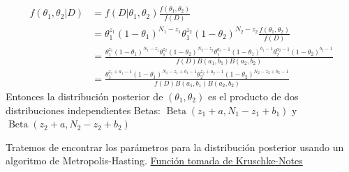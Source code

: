 \documentclass[
  12pt,
]{book}
\theoremstyle{definition}
\theoremstyle{definition}
\theoremstyle{definition}
\theoremstyle{definition}
\theoremstyle{remark}
\begin{document}
\begin{align*}
f\left(\theta_{1}, \theta_{2} | D\right) 
&=f\left(D | \theta_{1}, \theta_{2}\right) \frac{f\left(\theta_{1}, \theta_{2}\right)}{f(D)} \\
&=\theta_{1}^{z_{1}}\left(1-\theta_{1}\right)^{N_{1}-z_{1}} \theta_{1}^{z_{2}}\left(1-\theta_{2}\right)^{N_{2}-z_{2}} \frac{f\left(\theta_{1}, \theta_{2}\right)}{f(D)}  \\
&=\frac{\theta_{1}^{z_{1}}\left(1-\theta_{1}\right)^{N_{1}-z_{1}} \theta_{1}^{z_{2}}\left(1-\theta_{2}\right)^{N_{2}-z_{2}} \theta_{1}^{a_{1}-1}\left(1-\theta_{1}\right)^{b_{1}-1} \theta_{2}^{a_{2}-1}\left(1-\theta_{2}\right)^{b_{2}-1}}{f(D) B\left(a_{1}, b_{1}\right) B\left(a_{2}, b_{2}\right)} \\
&=\frac{\theta_{1}^{z_{1}+a_{1}-1}\left(1-\theta_{1}\right)^{N_{1}-z_{1}+b_{1}-1} \theta_{2}^{z_{2}+a_{2}-1}\left(1-\theta_{2}\right)^{N_{2}-z_{2}+b_{2}-1}}{f(D) B\left(a_{1}, b_{1}\right) B\left(a_{2}, b_{2}\right)}
\end{align*}
Entonces la distribución posterior de \(\left(\theta_{1}, \theta_{2}\right)\) es el producto de dos distribuciones independientes Betas:
\(\operatorname{Beta}\left(z_{1}+a, N_{1}-z_{1}+b_{1}\right)\) y \(\operatorname{Beta}\left(z_{2}+a, N_{2}-z_{2}+b_{2}\right)\)

Tratemos de encontrar los parámetros para la distribución posterior usando un algoritmo de Metropolis-Hasting. \href{https://rpruim.github.io/Kruschke-Notes/markov-chain-monte-carlo-mcmc.html\#metropolis}{Función tomada de Kruschke-Notes}
\end{document}
